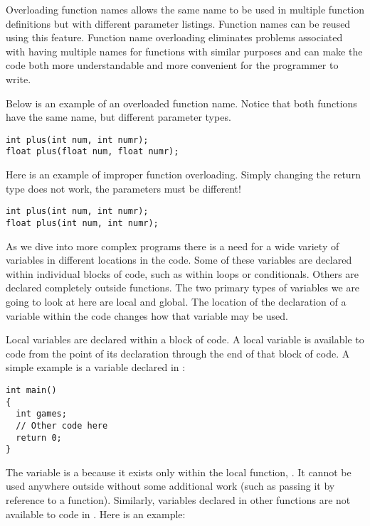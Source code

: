 
Overloading function names allows the same name to be used in multiple function definitions but with different parameter listings. 
Function names can be reused using this feature. 
Function name overloading eliminates problems associated with having multiple names for functions with similar purposes and can make the code both more understandable and more convenient for the programmer to write.

Below is an example of an overloaded function name. 
Notice that both functions have the same name, but different parameter types.

\begin{lstlisting}
int plus(int num, int numr);
float plus(float num, float numr);
\end{lstlisting}

Here is an example of improper function overloading. 
Simply changing the return type does not work, the parameters must be different!

\begin{lstlisting}
int plus(int num, int numr);
float plus(int num, int numr);  
\end{lstlisting}



As we dive into more complex programs there is a need for a wide variety of variables in different locations in the code. 
Some of these variables are declared within individual blocks of code, such as within loops or conditionals. 
Others are declared completely outside functions. 
The two primary types of variables we are going to look at here are local and global. 
The location of the declaration of a variable within the code changes how that variable may be used.
	
Local variables are declared within a block of code. 
A local variable is available to code from the point of its declaration through the end of that block of code. 
A simple example is a variable declared in :

\begin{lstlisting}
int main()
{
  int games;
  // Other code here
  return 0;
}
\end{lstlisting}

The variable  is a  because it exists only within the local function, . 
It cannot be used anywhere outside  without some additional work (such as passing it by reference to a function). 
Similarly, variables declared in other functions are not available to code in . 
Here is an example:

